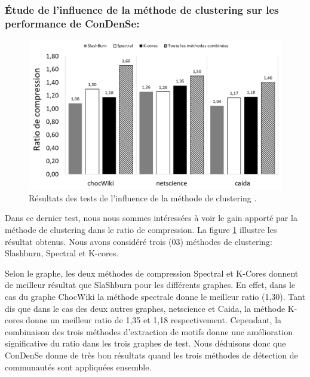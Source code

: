 		\subsubsection{Étude de l'influence de la méthode de clustering sur les performance de \gls{ConDenSe}:}	
		
		\begin{figure}[H]
			\centering
			
			\includegraphics[scale=0.6]{ressources/image/clustmthd.png}
			
			\caption{Résultats des tests de l'influence de la méthode de clustering .}
			\label{fig:test-clustmtd}
	
	\end{figure}	
		
	
	Dans ce dernier test, nous nous sommes intéressées à voir le gain apporté par la méthode de clustering dans le ratio de compression. La figure \ref{fig:test-clustmtd} illustre les résultat obtenus. Nous avons considéré trois (03) méthodes de clustering: Slashburn, Spectral et K-cores. 
	
	Selon le graphe, les deux méthodes de compression Spectral et K-Cores donnent de meilleur résultat que SlaShburn pour les différents graphes. En effet, dans le cas du graphe ChocWiki la méthode spectrale donne le meilleur ratio (1,30). Tant dis que dans le cas des deux autres graphes, netscience et Caida, la méthode K-cores donne un meilleur ratio de 1,35 et 1,18 respectivement. Cependant, la combinaison des trois méthodes d'extraction de motifs donne une amélioration significative du ratio dans les trois graphes de test. 
Nous déduisons donc que \gls{ConDenSe} donne de très bon résultats quand les trois méthodes de détection de communautés sont appliquées ensemble.

	
